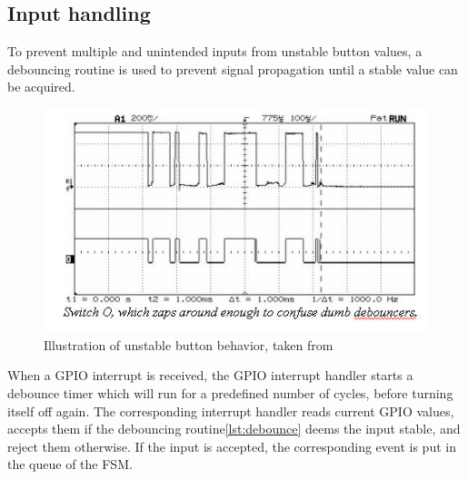 \subsection{Input handling}
To prevent multiple and unintended inputs from unstable button values, a debouncing routine is used to prevent signal propagation until a stable value can be acquired.

\begin{figure}[h]
    \includegraphics{figures/debounceswitcho.jpg}
    \caption{Illustration of unstable button behavior, taken from \cite{debouncer}}
\end{figure}
When a GPIO interrupt is received, the GPIO interrupt handler starts a debounce timer which will run for a predefined number of cycles, before turning itself off again.
The corresponding interrupt handler reads current  GPIO values, accepts them if the debouncing routine\ref{lst:debounce} deems the input stable, and reject them otherwise.
If the input is accepted, the corresponding event is put in the queue of the FSM.



